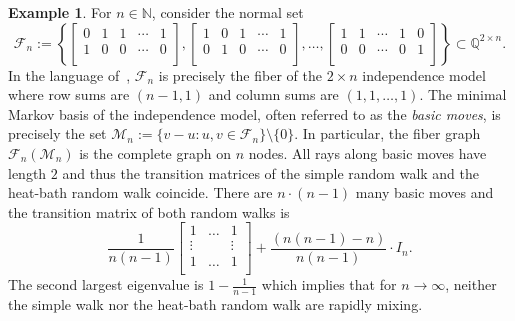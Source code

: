 \documentclass[11pt]{amsart}
\theoremstyle{definition}
\newtheorem{example}[thm]{Example}
\numberwithin{equation}{section}
\newcommand{\ring}[1]{\ensuremath{\mathbb{#1}}}
\renewcommand{\>}{\rangle}
\newcommand{\<}{\langle}
\newcommand{\0}{\mathbf{0}}
\newcommand{\1}{\mathbf{1}}
\newcommand{\2}{\mathbf{2}}
\newcommand\NN{\ring{N}}
\newcommand\QQ{\ring{Q}}
\newcommand\cF{{\mathcal F}}
\newcommand\cM{{\mathcal M}}
\begin{document}
\begin{example}\label{ex:NoSpeedup}
For $n\in\NN$, consider the normal set
\begin{equation*}
\cF_n:=
\left\{
\begin{bmatrix}
0 & 1 & 1 &\cdots& 1\\
1 & 0 & 0 &\cdots& 0\\
\end{bmatrix},
\begin{bmatrix}
1 & 0 & 1 &\cdots& 1 \\
0 & 1 & 0 &\cdots& 0\\
\end{bmatrix},
\ldots,
\begin{bmatrix}
1 & 1 &\cdots & 1 & 0 \\
0 & 0 &\cdots & 0 & 1 \\
\end{bmatrix}\right\}\subset\QQ^{2\times n}.
\end{equation*}
In the language of~\cite[Section~1.1]{drton2008}, $\cF_n$ is precisely
the fiber of the $2 \times n$ independence model where row sums are
$(n-1,1)$ and column sums are $(1,1,\ldots,1)$. The minimal Markov
basis of the independence model, often referred to as the \emph{basic
moves}, is precisely the set $\cM_n:=\{v-u: u,v\in
\cF_n\}\setminus\{0\}$.  In particular, the fiber graph $\cF_n(\cM_n)$ is
the complete graph on $n$ nodes. All rays along basic moves have
length $2$ and thus the transition matrices of the simple random walk
and the heat-bath random walk coincide. There are $n\cdot(n-1)$ many
basic moves and the transition matrix of both random walks is
\begin{equation*}
\frac{1}{n(n-1)}
\begin{bmatrix}
1 & \dots & 1 \\ 
\vdots & & \vdots \\ 
1 & \dots & 1 \\ 
\end{bmatrix}
+
\frac{(n(n-1)-n)}{n(n-1)}\cdot I_n.
\end{equation*}
The second largest eigenvalue is $1-\frac{1}{n-1}$ which implies that
for $n\to\infty$, neither the simple walk nor the heat-bath random walk
are rapidly mixing.
\end{example}
\end{document}
